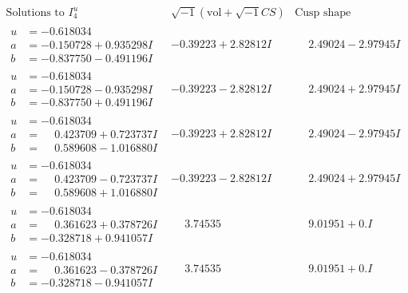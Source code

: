 \documentclass[1p]{elsarticle_modified}
\theoremstyle{definition}
\newcommand{\I}{\sqrt{-1}}
\begin{document}
$$\begin{array}{c|c|c}  
\text{Solutions to }I^u_{4}& \I (\text{vol} + \sqrt{-1}CS) & \text{Cusp shape}\\
 \hline 
\begin{aligned}
u &= -0.618034\phantom{ +0.000000I} \\
a &= -0.150728 + 0.935298 I \\
b &= -0.837750 - 0.491196 I\end{aligned}
 & -0.39223 + 2.82812 I & \phantom{-}2.49024 - 2.97945 I \\ \hline\begin{aligned}
u &= -0.618034\phantom{ +0.000000I} \\
a &= -0.150728 - 0.935298 I \\
b &= -0.837750 + 0.491196 I\end{aligned}
 & -0.39223 - 2.82812 I & \phantom{-}2.49024 + 2.97945 I \\ \hline\begin{aligned}
u &= -0.618034\phantom{ +0.000000I} \\
a &= \phantom{-}0.423709 + 0.723737 I \\
b &= \phantom{-}0.589608 - 1.016880 I\end{aligned}
 & -0.39223 + 2.82812 I & \phantom{-}2.49024 - 2.97945 I \\ \hline\begin{aligned}
u &= -0.618034\phantom{ +0.000000I} \\
a &= \phantom{-}0.423709 - 0.723737 I \\
b &= \phantom{-}0.589608 + 1.016880 I\end{aligned}
 & -0.39223 - 2.82812 I & \phantom{-}2.49024 + 2.97945 I \\ \hline\begin{aligned}
u &= -0.618034\phantom{ +0.000000I} \\
a &= \phantom{-}0.361623 + 0.378726 I \\
b &= -0.328718 + 0.941057 I\end{aligned}
 & \phantom{-}3.74535\phantom{ +0.000000I} & \phantom{-}9.01951 + 0. I\phantom{ +0.000000I} \\ \hline\begin{aligned}
u &= -0.618034\phantom{ +0.000000I} \\
a &= \phantom{-}0.361623 - 0.378726 I \\
b &= -0.328718 - 0.941057 I\end{aligned}
 & \phantom{-}3.74535\phantom{ +0.000000I} & \phantom{-}9.01951 + 0. I\phantom{ +0.000000I} \\ \hline\begin{aligned}

\end{aligned}
\end{array}$$
\end{document}
